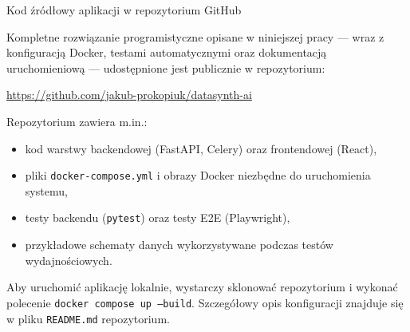 \begin{easyappendix}{Kod źródłowy aplikacji w repozytorium GitHub}
\label{app:github}

Kompletne rozwiązanie programistyczne opisane w niniejszej pracy --- wraz z konfiguracją Docker, testami automatycznymi oraz dokumentacją uruchomieniową --- udostępnione jest publicznie w repozytorium:

\url{https://github.com/jakub-prokopiuk/datasynth-ai}

Repozytorium zawiera m.in.:
\begin{itemize}
    \item kod warstwy backendowej (FastAPI, Celery) oraz frontendowej (React),
    \item pliki \texttt{docker-compose.yml} i obrazy Docker niezbędne do uruchomienia systemu,
    \item testy backendu (\texttt{pytest}) oraz testy \gls{E2E} (Playwright),
    \item przykładowe schematy danych wykorzystywane podczas testów wydajnościowych.
\end{itemize}

Aby uruchomić aplikację lokalnie, wystarczy sklonować repozytorium i wykonać polecenie \texttt{docker compose up --build}. Szczegółowy opis konfiguracji znajduje się w pliku \texttt{README.md} repozytorium.
\end{easyappendix}
